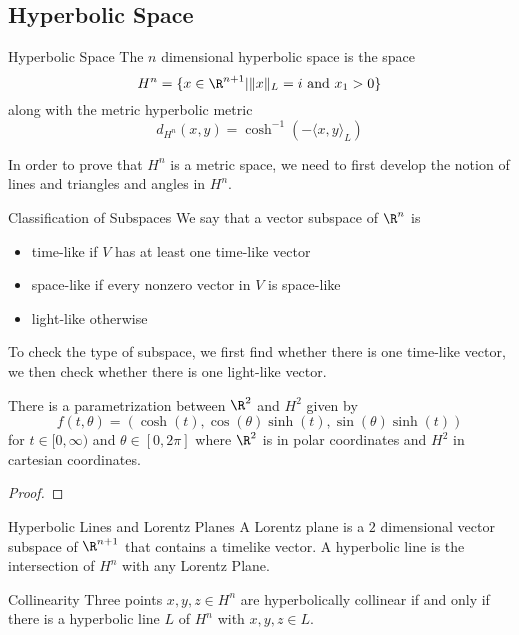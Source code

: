 \subsection{Hyperbolic Space}
\begin{defn}{Hyperbolic Space}{} The $n$ dimensional hyperbolic space is the space $$H^n=\{x\in\R^{n+1}|\|x\|_L=i\text{ and }x_1>0\}$$ along with the metric hyperbolic metric $$d_{H^n}(x,y)=\cosh^{-1}(-\langle x,y\rangle_L)$$
\end{defn}

In order to prove that $H^n$ is a metric space, we need to first develop the notion of lines and triangles and angles in $H^n$. 

\begin{defn}{Classification of Subspaces}{} We say that a vector subspace of $\R^n$ is 
\begin{itemize}
\item time-like if $V$ has at least one time-like vector
\item space-like if every nonzero vector in $V$ is space-like
\item light-like otherwise
\end{itemize}
\end{defn}

To check the type of subspace, we first find whether there is one time-like vector, we then check whether there is one light-like vector. 

\begin{prp}{}{} There is a parametrization between $\R^2$ and $H^2$ given by $$f(t,\theta)=(\cosh(t),\cos(\theta)\sinh(t),\sin(\theta)\sinh(t))$$ for $t\in[0,\infty)$ and $\theta\in[0,2\pi]$ where $\R^2$ is in polar coordinates and $H^2$ in cartesian coordinates. \tcbline
\begin{proof}

\end{proof}
\end{prp}

\begin{defn}{Hyperbolic Lines and Lorentz Planes}{} A Lorentz plane is a $2$ dimensional vector subspace of $\R^{n+1}$ that contains a timelike vector. A hyperbolic line is the intersection of $H^n$ with any Lorentz Plane. 
\end{defn}

\begin{defn}{Collinearity}{} Three points $x,y,z\in H^n$ are hyperbolically collinear if and only if there is a hyperbolic line $L$ of $H^n$ with $x,y,z\in L$. 
\end{defn}

